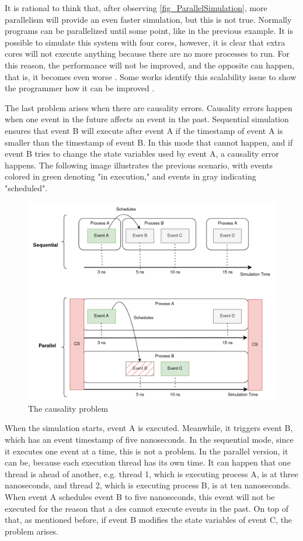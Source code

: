 It is rational to think that, after observing \autoref{fig_ParallelSimulation}, more parallelism will provide an even faster simulation, but 
this is not true. Normally programs can be parallelized until some point, like in the previous example.
It is possible to simulate this system with four 
cores, however, it is clear that extra cores will not execute anything because there are no more processes to run. For this reason, 
the performance will not be improved, and the opposite can happen, that is, it becomes even worse \cite{scabilityIssue}. Some works identify 
this scalability issue to show the programmer how it can be improved \cite{scalabilityProblem} \cite{scalabilityProblem2}.

The last problem arises when there are causality errors. Causality errors happen when one event in the future affects an event in the past. 
Sequential simulation ensures that event B will execute after event A if the timestamp of event A is smaller than the timestamp of event B. 
In this mode that cannot happen, and if event B tries to change the state variables used by event A, a causality error happens. The following image 
illustrates the previous scenario, with events colored in green denoting "in execution," and events in gray indicating "scheduled".

\begin{figure}[H]
	\centering
 	\includegraphics[width=0.85\linewidth]{Images/CausalityError.png}
 	\caption{The causality problem}
	 \label{fig_causalityError}
\end{figure}

When the simulation starts, event A is executed. Meanwhile, it triggers event B, which has an event timestamp of five nanoseconds. In the 
sequential mode, since it executes one event at a time, this is not a problem. In the parallel version, it can be, because each execution 
thread has its own time. It can happen that one thread is ahead of another, e.g. thread 1, which is executing process A, is at three nanoseconds, 
and thread 2, which is executing process B, is at ten nanoseconds. When event A schedules event B to five nanoseconds, this event will 
not be executed for the reason that a \gls{des} cannot execute events in the past. On top of that, as mentioned before, if event B modifies 
the state variables of event C, the problem arises. 

